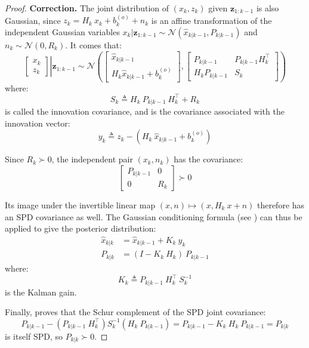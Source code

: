 \begin{proof}
	\textbf{Correction.} The joint distribution of $(x_k,z_k)$ given $\mathbf{z}_{1:k-1}$ is also Gaussian, since $z_k=H_k\:x_k+b_k^{(o)}+n_k$ is an affine transformation of the independent Gaussian variables $x_k|\mathbf{z}_{1:k-1}\sim\mathcal{N}\left(\hat{x}_{k|k-1},P_{k|k-1}\right)$ and $n_k\sim\mathcal{N}(0,R_k)$. It comes that:
	\begin{equation}
		\left.\begin{bmatrix}
		x_k\\z_k
		\end{bmatrix}\right|
		\mathbf{z}_{1:k-1}\sim\mathcal{N}
		\left(\begin{bmatrix}
		\hat{x}_{k|k-1}\\H_k\hat{x}_{k|k-1}+b_k^{(o)}
		\end{bmatrix},
		\begin{bmatrix}
		P_{k|k-1}&P_{k|k-1}H_k^\top\\
		H_k P_{k|k-1}&S_k
		\end{bmatrix}\right)
	\end{equation}
	where:
	\begin{equation}
		S_k\triangleq H_k\:P_{k|k-1}\:H_k^\top+R_k
	\end{equation}
	is called the innovation covariance, and is the covariance associated with the innovation vector:
	\begin{equation}
		y_k\triangleq z_k-\left(H_k\:\hat{x}_{k|k-1}+b_k^{(o)}\right)
	\end{equation}

	Since $R_k\succ0$, the independent pair $(x_k,n_k)$ has the covariance:
	\begin{equation}
		\begin{bmatrix}
		P_{k|k-1}&0\\0&R_k
		\end{bmatrix}\succ0
	\end{equation}

	Its image under the invertible linear map $(x,n)\mapsto(x,H_k\:x+n)$ therefore has an SPD covariance as well. The Gaussian conditioning formula (see ) can thus be applied to give the posterior distribution:
	\begin{align}
		\hat{x}_{k|k}&=\hat{x}_{k|k-1}+K_k\:y_k\\
		P_{k|k}&=(I-K_k\:H_k)\:P_{k|k-1}
	\end{align}
	where:
	\begin{equation}
		K_k\triangleq P_{k|k-1}\:H_k^\top\:S_k^{-1}
	\end{equation}
	is the Kalman gain.

	Finally,  proves that the Schur complement of the SPD joint covariance:
	\begin{equation}
		P_{k|k-1}-\left(P_{k|k-1}\:H_k^\top\right)S_k^{-1}\left(H_k\:P_{k|k-1}\right)=P_{k|k-1}-K_k\:H_k\:P_{k|k-1}=P_{k|k}
	\end{equation}
	is itself SPD, so $P_{k|k}\succ0$.
\end{proof}

